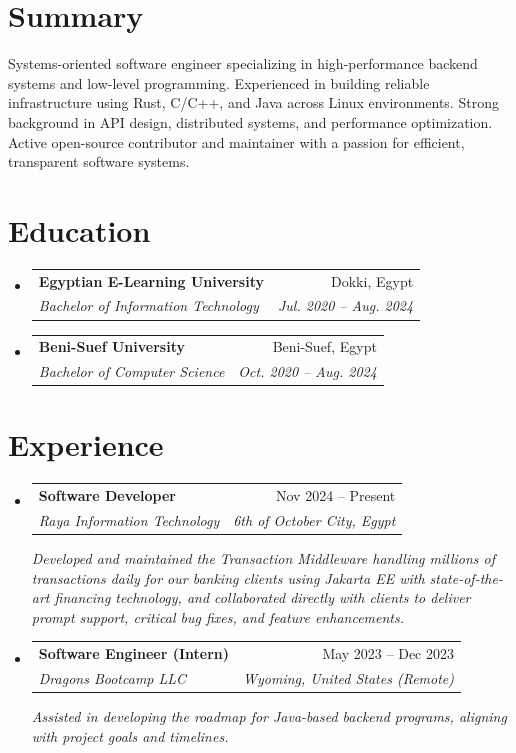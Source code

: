 \documentclass[letterpaper,11pt]{article}
\makeatletter
\newcommand{\resumeSubheading}[4]{
  \vspace{-2pt}\item
    \begin{tabular*}{0.97\textwidth}[t]{l@{\extracolsep{\fill}}r}
      \textbf{\color{primary}#1} & \color{primary}#2 \\
      \textit{\small\color{primary}#3} & \textit{\small\color{primary}#4} \\
    \end{tabular*}\vspace{-7pt}
}
\newcommand{\resumeSubheadingExp}[5]{
  \vspace{-2pt}\item
    \begin{tabular*}{0.97\textwidth}[t]{l@{\extracolsep{\fill}}r}
      \textbf{\color{primary}#1} & \color{primary}#2 \\
      \textit{\small\color{primary}#3} & \textit{\small\color{primary}#4} \\
    \end{tabular*}
    \vspace{-2pt}\hspace{6pt}\textit{\small\color{primary}#5}
    \vspace{-4pt}
}
\newcommand{\resumeSubHeadingListStart}{\begin{itemize}[leftmargin=0.15in, label={}]}
\newcommand{\resumeSubHeadingListEnd}{\end{itemize}}
\makeatother
\begin{document}
\section{Summary}
Systems-oriented software engineer specializing in high-performance backend systems and low-level programming. 
Experienced in building reliable infrastructure using Rust, C/C++, and Java across Linux environments. 
Strong background in API design, distributed systems, and performance optimization. 
Active open-source contributor and maintainer with a passion for efficient, transparent software systems.

\section{Education}
  \resumeSubHeadingListStart
    \resumeSubheading
      {Egyptian E-Learning University}{Dokki, Egypt}
      {Bachelor of Information Technology}{Jul. 2020 -- Aug. 2024}
    \resumeSubheading
      {Beni-Suef University}{Beni-Suef, Egypt}
      {Bachelor of Computer Science}{Oct. 2020 -- Aug. 2024}
  \resumeSubHeadingListEnd

\section{Experience}
   \resumeSubHeadingListStart
      \resumeSubheadingExp
        {Software Developer}{Nov 2024 -- Present}
        {Raya Information Technology}{6th of October City, Egypt}
        {Developed and maintained the Transaction Middleware handling millions of transactions daily for our banking clients
        using Jakarta EE with state-of-the-art financing technology, and collaborated directly with clients
        to deliver prompt support, critical bug fixes, and feature enhancements.}
        \resumeSubheadingExp
        {Software Engineer (Intern)}{May 2023 -- Dec 2023}
        {Dragons Bootcamp LLC}{Wyoming, United States (Remote)}
        {Assisted in developing the roadmap for Java-based backend programs, aligning with project goals and timelines.}
  \resumeSubHeadingListEnd

\end{document}
